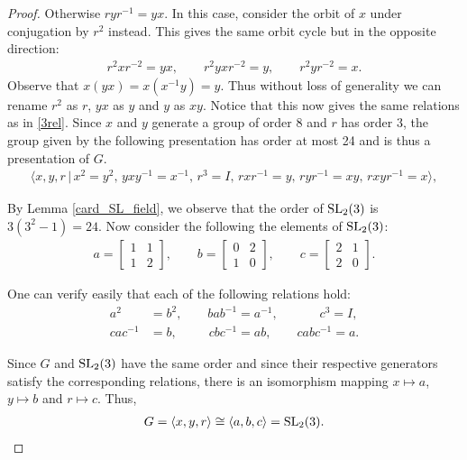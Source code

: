 \begin{proof}
Otherwise $r y r^{-1} = yx$. In this case, consider the orbit of $x$ under conjugation by $r^2$ instead. This gives the same orbit cycle but in the opposite direction:
\begin{align*} r^2 x r^{-2} = yx, \qquad r^2 yx r^{-2} = y, \qquad r^2 y r^{-2} = x.
\end{align*}
Observe that $x(yx) = x (x^{-1} y) = y$. Thus without loss of generality we can rename $r^2$ as $r$, $yx$ as $y$ and $y$ as $xy$. Notice that this now gives the same relations as in \eqref{3rel}. Since $x$ and $y$ generate a group of order 8 and $r$ has order 3, the group given by the following presentation has order at most 24 and is thus a presentation of $G$. 
\begin{align*} \langle x, y, r \, |  \, x^2= y^2, \, y x y^{-1} = x^{-1}, \, r^3 = I, \, r x r^{-1} = y, \, r y r^{-1} = xy, \, r xy r^{-1} = x \rangle,
\end{align*}

By Lemma \ref{card_SL_field}, we observe that the order of $\operatorname{SL}_2(3)$ is $3(3^2-1) = 24$. Now consider the following the elements of $\operatorname{SL}_2(3)$:
\begin{align*} a = \begin{bmatrix} 1 & 1 \\ 1 & 2 \end{bmatrix}, \qquad b = \begin{bmatrix} 0 & 2 \\ 1 & 0 \end{bmatrix}, \qquad c = \begin{bmatrix} 2 & 1 \\ 2 & 0 \end{bmatrix}.
\end{align*}

One can verify easily that each of the following relations hold:
\begin{align*} a^2 &= b^2, \qquad b a b^{-1} = a^{-1}, \qquad \quad \; c^3 = I, 
\\ c a c^{-1} &= b,  \qquad \; \: c b c^{-1} = ab, \qquad \! c ab c^{-1} = a.
\end{align*}

Since $G$ and $\operatorname{SL}_2(3)$ have the same order and since their respective generators satisfy the corresponding relations, there is an isomorphism mapping $x \mapsto a$, $y \mapsto b$ and $r \mapsto c$. Thus,
\begin{align*} G = \langle x, y, r \rangle \cong \langle a, b, c \rangle = \operatorname{SL}_2(3). 
\end{align*} 
\end{proof}




